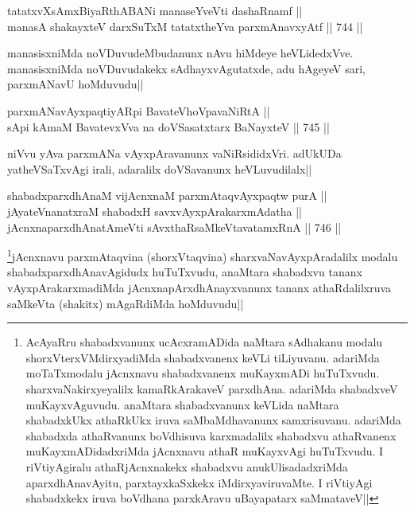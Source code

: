 \begin{shl}
tatatxvXsAmxBiyaRthA\s BANi manaseYveVti dashaRnamf || \\
manasA shakayxteV darxSuTxM tatatxtheYva parxmAnavxyAtf ||  744 ||  
\end{shl}	

\begin{artha} 
manasisxniMda noVDuvudeMbudanunx nAvu hiMdeye heVLidedxVve. 
manasisxniMda noVDuvudakekx sAdhayxvAgutatxde, adu hAgeyeV sari, 
parxmANavU hoMduvudu||
\end{artha}


\begin{shl}
parxmANavAyxpaqtiyAR\s pi BavateVhoVpavaNiRtA || \\
sA\s pi kAmaM BavatevxVva na doVSasatxtarx BaNayxteV ||  745 || 
\end{shl}

\begin{artha} 
niVvu yAva parxmANa vAyxpAravanunx vaNiRsididxVri. adUkUDa 
yatheVSaTxvAgi irali, adaralilx doVSavanunx heVLuvudilalx||
\end{artha}

\begin{shl}
shabadxparxdhAnaM vijAcnxnaM parxmAtaqvAyxpaqtw purA || \\
jAyateV\s nanatxraM shabadxH savxvAyxpArakarxmAdatha || \\
jAcnxnaparxdhAnatAmeVti sAvxthaRsaMkeVtavatamxRnA ||  746 ||  
\end{shl}

\begin{artha} 
\footnote[1]{AcAyaRru shabadxvanunx ucAcxramADida naMtara sAdhakanu 
modalu shorxVterxVMdirxyadiMda shabadxvanenx keVLi tiLiyuvanu. 
adariMda moTaTxmodalu jAcnxnavu shabadxvanenx muKayxmADi huTuTxvudu. 
sharxvaNakirxyeyalilx kamaRkArakaveV parxdhAna. adariMda shabadxveV 
muKayxvAguvudu. anaMtara shabadxvanunx keVLida naMtara shabadxkUkx 
athaRkUkx iruva saMbaMdhavanunx samxrisuvanu. adariMda shabadxda 
athaRvanunx boVdhisuva karxmadalilx shabadxvu athaRvanenx 
muKayxmADidadxriMda jAcnxnavu athaR muKayxvAgi huTuTxvudu. I 
riVtiyAgiralu athaRjAcnxnakekx shabadxvu anukUlisadadxriMda 
aparxdhAnavAyitu, parxtayxkaSxkekx iMdirxyaviruvaMte. I riVtiyAgi 
shabadxkekx iruva boVdhana parxkAravu uBayapatarx 
saMmataveV||}jAcnxnavu parxmAtaqvina (shorxVtaqvina) 
sharxvaNavAyxpAradalilx modalu shabadxparxdhAnavAgidudx huTuTxvudu, 
anaMtara shabadxvu tananx vAyxpArakarxmadiMda jAcnxnapArxdhAnayxvanunx 
tananx athaRdalilxruva saMkeVta (shakitx) mAgaRdiMda hoMduvudu||
\end{artha}

